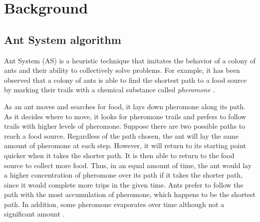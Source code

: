 \documentclass[11pt]{article}
\begin{document}
\section{Background}\label{background} 

\subsection{Ant System algorithm}\label{max_clique} 

Ant System (AS) is a heuristic technique that imitates the behavior of a
colony of ants and their ability to collectively solve problems.  For
example, it has been observed that a colony of ants is able to find the
shortest path to a food source by marking their trails with a chemical
substance called {\it pheromone} \cite{BDT}\cite{DG}.

As an ant moves and searches for food, it lays down pheromone along its
path. As it decides where to move, it looks for pheromone trails and prefers
to follow trails with higher levels of pheromone. Suppose there are two
possible paths to reach a food source.  Regardless of the path chosen, the ant
will lay the same amount of pheromone at each step. However, it will return to
its starting point quicker when it takes the shorter path.  It is then able to
return to the food source to collect more food.  Thus, in an equal amount of
time, the ant would lay a higher concentration of pheromone over its path if
it takes the shorter path, since it would complete more trips in the given
time.  Ants prefer to follow the path with the most accumulation of pheromone,
which happens to be the shortest path. In addition, some pheromone evaporates
over time although not a significant amount \cite{BDT}\cite{DG}.
\end{document}
